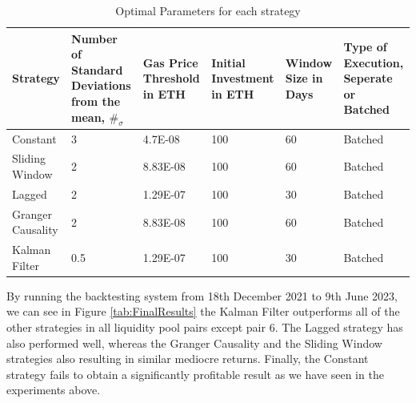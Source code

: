 \begin{table}[H]
    \centering
    \begin{tabular}{|p{4em}|p{8em}|p{4em}|p{4em}|p{4em}|p{8em}|}
    \hline
        Strategy & Number of Standard Deviations from the mean, $\#_{\sigma}$ & Gas Price Threshold in ETH & Initial Investment in ETH & Window Size in Days & Type of Execution, Seperate or Batched \\ \hline
        Constant & 3 & 4.7E-08 & 100 & 60 & Batched \\ \hline
        Sliding Window & 2 & 8.83E-08 & 100 & 60 & Batched \\ \hline
        Lagged & 2 & 1.29E-07 & 100 & 30 & Batched \\ \hline
        Granger Causality & 2 & 8.83E-08 & 100 & 60 & Batched \\ \hline
        Kalman Filter & 0.5 & 1.29E-07 & 100 & 30 & Batched \\ \hline
    \end{tabular}
    \caption{Optimal Parameters for each strategy \label{tab:OptimParams}}
\end{table}

By running the backtesting system from 18th December 2021 to 9th June 2023, we can see in Figure \ref{tab:FinalResults} the Kalman Filter outperforms all of the other strategies in all liquidity pool pairs except pair 6. The Lagged strategy has also performed well, whereas the Granger Causality and the Sliding Window strategies also resulting in similar mediocre returns. Finally, the Constant strategy fails to obtain a significantly profitable result as we have seen in the experiments above.

